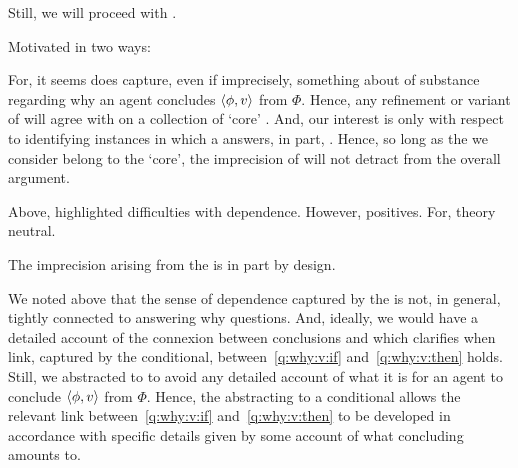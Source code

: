 \begin{note}
  Still, we will proceed with \qWhyV{}.

  Motivated in two ways:
\end{note}

\begin{note}[Way A]
  For, it seems \qWhyV{} does capture, even if imprecisely, something about of substance regarding why an agent concludes \(\langle \phi, v \rangle\) from \(\Phi\).
  Hence, any refinement or variant of \qWhyV{} will agree with \qWhyV{} on a collection of `core' .
  And, our interest is only with respect to identifying instances in which a \ros{} answers, in part, \qWhyV{}.
  Hence, so long as the  we consider belong to the `core', the imprecision of \qWhyV{} will not detract from the overall argument.
\end{note}

\begin{note}[Way B]
  Above, highlighted difficulties with dependence.
  However, positives.
  For, theory neutral.

  The imprecision arising from the \itc{} is in part by design.

  We noted above that the sense of dependence captured by the \itc{} is not, in general, tightly connected to answering why questions.
  And, ideally, we would have a detailed account of the connexion between conclusions and  which clarifies when link, captured by the conditional, between~\ref{q:why:v:if} and~\ref{q:why:v:then} holds.
  Still, we abstracted to  to avoid any detailed account of what it is for an agent to conclude \(\langle \phi, v \rangle\) from \(\Phi\).
  Hence, the abstracting to a conditional allows the relevant link between~\ref{q:why:v:if} and~\ref{q:why:v:then} to be developed in accordance with specific details given by some account of what concluding amounts to.
\end{note}


\subsection{\qHowV{}}
\label{cha:var:sec:vars:qhowv}

